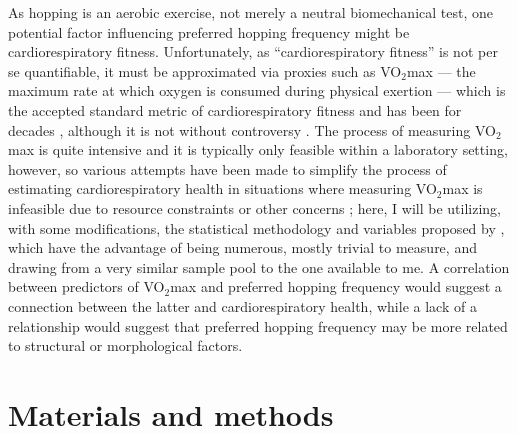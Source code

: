 \documentclass{article}
\begin{document}
As hopping is an aerobic exercise, not merely a neutral biomechanical test, one potential factor influencing preferred hopping frequency might be cardiorespiratory fitness. Unfortunately, as ``cardiorespiratory fitness'' is not per se quantifiable, it must be approximated via proxies such as VO$_2$max --- the maximum rate at which oxygen is consumed during physical exertion --- which is the accepted standard metric of cardiorespiratory fitness and has been for decades \parencite{hamlin2014,siconolfi1982}, although it is not without controversy \parencite{green2018}. The process of measuring VO$_2$max is quite intensive and it is typically only feasible within a laboratory setting, however, so various attempts have been made to simplify the process of estimating cardiorespiratory health in situations where measuring VO$_2$max is infeasible due to resource constraints or other concerns \parencite{ashfaq2022,george1996,grant1999}; here, I will be utilizing, with some modifications, the statistical methodology and variables proposed by \textcite{abut2016}, which have the advantage of being numerous, mostly trivial to measure, and drawing from a very similar sample pool to the one available to me. A correlation between predictors of VO$_2$max and preferred hopping frequency would suggest a connection between the latter and cardiorespiratory health, while a lack of a relationship would suggest that preferred hopping frequency may be more related to structural or morphological factors. 

\section{Materials and methods}
\end{document}
